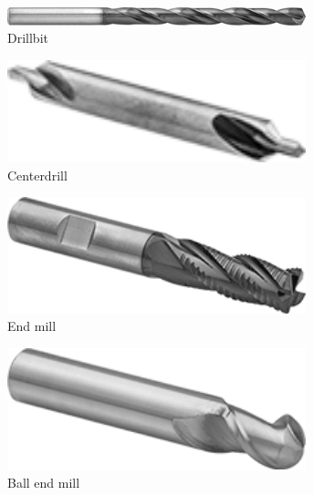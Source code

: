 \documentclass[10pt,letterpaper]{book}
\begin{document}
 \begin{figure}[H]
	\centering
	\begin{subfigure}[b]{.19\linewidth}
		\includegraphics[width=0.95\textwidth]{imgs/drillbit.png}
		\caption{Drillbit}
	\end{subfigure} \begin{subfigure}[b]{.19\linewidth}
		\includegraphics[width=0.95\textwidth]{imgs/centerdrill.png}
		\caption{Centerdrill}
	\end{subfigure}	\begin{subfigure}[b]{.19\linewidth}
		\includegraphics[width=0.95\textwidth]{imgs/endmill.png}
		\caption{End mill}
	\end{subfigure}	\begin{subfigure}[b]{.19\linewidth}
		\includegraphics[width=0.95\textwidth]{imgs/ball_endmill.png}
		\caption{Ball end mill}
	\end{subfigure}\begin{subfigure}[b]{.19\linewidth}

\end{subfigure}
\end{figure}
\end{document}
